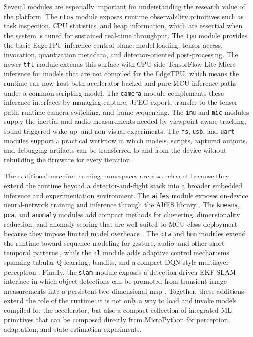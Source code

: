 Several modules are especially important for understanding the research
value of the platform. The \texttt{rtos} module exposes runtime
observability primitives such as task inspection, CPU statistics, and
heap information, which are essential when the system is tuned for
sustained real-time throughput. The \texttt{tpu} module provides the
basic EdgeTPU inference control plane: model loading, tensor access,
invocation, quantization metadata, and detector-oriented
post-processing. The newer \texttt{tfl} module extends this surface with
CPU-side TensorFlow Lite Micro inference for models that are not
compiled for the EdgeTPU, which means the runtime can now host both
accelerator-backed and pure-MCU inference paths under a common scripting
model. The \texttt{camera} module complements these inference interfaces
by managing capture, JPEG export, transfer to the tensor path, runtime
camera switching, and frame sequencing. The \texttt{imu} and
\texttt{mic} modules supply the inertial and audio measurements needed
by viewpoint-aware tracking, sound-triggered wake-up, and non-visual
experiments. The \texttt{fs}, \texttt{usb}, and \texttt{uart} modules
support a practical workflow in which models, scripts, captured outputs,
and debugging artifacts can be transferred to and from the device
without rebuilding the firmware for every iteration.

The additional machine-learning namespaces are also relevant because
they extend the runtime beyond a detector-and-flight stack into a
broader embedded inference and experimentation environment. The
\texttt{aifes} module exposes on-device neural-network training and
inference through the AIfES library \citep{AIfES2024}. The
\texttt{kmeans}, \texttt{pca}, and \texttt{anomaly} modules add compact
methods for clustering, dimensionality reduction, and anomaly scoring
that are well suited to MCU-class deployment because they impose limited
model overheads
\citep{Jain2010, Jolliffe2016, Chandola2009, Pimentel2014}. The
\texttt{dtw} and \texttt{hmm} modules extend the runtime toward sequence
modeling for gesture, audio, and other short temporal patterns
\citep{Salvador2007, Bilmes1998}, while the \texttt{rl} module adds
adaptive control mechanisms spanning tabular Q-learning, bandits, and a
compact DQN-style multilayer perceptron
\citep{Watkins1992, Auer2002, Russo2018, Mnih2015}. Finally, the
\texttt{slam} module exposes a detection-driven EKF-SLAM interface in
which object detections can be promoted from transient image
measurements into a persistent two-dimensional map
\citep{DurrantWhyte2006, Cadena2016}. Together, these additions extend
the role of the runtime: it is not only a way to load and invoke models
compiled for the accelerator, but also a compact collection of
integrated ML primitives that can be composed directly from MicroPython
for perception, adaptation, and state-estimation experiments.

